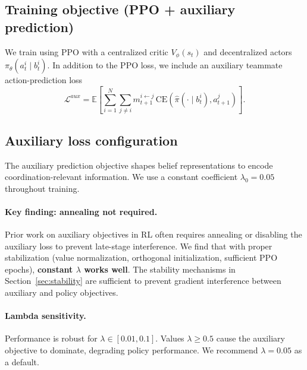 \documentclass{article}
\theoremstyle{plain}
\theoremstyle{definition}
\theoremstyle{remark}
\begin{document}
\subsection{Training objective (PPO + auxiliary prediction)}
We train using PPO with a centralized critic $V_\phi(s_t)$ and decentralized actors $\pi_\theta(a_t^i\mid b_t^i)$. In addition to the PPO loss, we include an auxiliary teammate action-prediction loss
\begin{equation}
\mathcal{L}^{aux}
=
\mathbb{E}\left[\sum_{i=1}^N\sum_{j\neq i} m_{t+1}^{i\leftarrow j}\,\mathrm{CE}(\hat{\pi}(\cdot\mid b_t^i), a_{t+1}^j)\right].
\end{equation}

\subsection{Auxiliary loss configuration}
The auxiliary prediction objective shapes belief representations to encode coordination-relevant information. We use a constant coefficient $\lambda_0 = 0.05$ throughout training.

\paragraph{Key finding: annealing not required.}
Prior work on auxiliary objectives in RL often requires annealing or disabling the auxiliary loss to prevent late-stage interference. We find that with proper stabilization (value normalization, orthogonal initialization, sufficient PPO epochs), \textbf{constant $\lambda$ works well}. The stability mechanisms in Section~\ref{sec:stability} are sufficient to prevent gradient interference between auxiliary and policy objectives.

\paragraph{Lambda sensitivity.}
Performance is robust for $\lambda \in [0.01, 0.1]$. Values $\lambda \geq 0.5$ cause the auxiliary objective to dominate, degrading policy performance. We recommend $\lambda = 0.05$ as a default.
\end{document}
